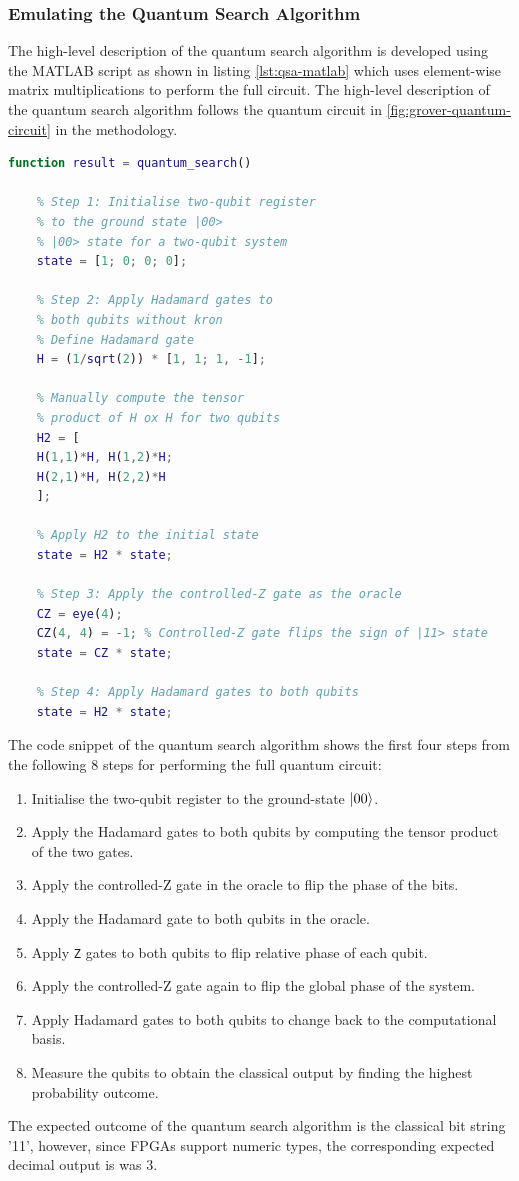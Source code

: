 \subsubsection{Emulating the Quantum Search Algorithm}

The high-level description of the quantum search algorithm is developed using the MATLAB script as shown in listing \ref{lst:qsa-matlab} which uses element-wise matrix multiplications to perform the full circuit. The high-level description of the quantum search algorithm follows the quantum circuit in \ref{fig:grover-quantum-circuit} in the methodology. 
\begin{lstlisting}[language=Matlab, caption={Code snippet of the MATLAB high-level description of the quantum search algorithm perform as element-wise matrix operations.}, label={lst:qsa-matlab}]
function result = quantum_search()

	% Step 1: Initialise two-qubit register 
	% to the ground state |00>
	% |00> state for a two-qubit system
	state = [1; 0; 0; 0]; 
	
	% Step 2: Apply Hadamard gates to
	% both qubits without kron
	% Define Hadamard gate
	H = (1/sqrt(2)) * [1, 1; 1, -1];
	
	% Manually compute the tensor 
	% product of H ox H for two qubits
	H2 = [
	H(1,1)*H, H(1,2)*H;
	H(2,1)*H, H(2,2)*H
	];
	
	% Apply H2 to the initial state
	state = H2 * state;
	
	% Step 3: Apply the controlled-Z gate as the oracle
	CZ = eye(4);
	CZ(4, 4) = -1; % Controlled-Z gate flips the sign of |11> state
	state = CZ * state;
	
	% Step 4: Apply Hadamard gates to both qubits
	state = H2 * state;
\end{lstlisting}
The code snippet of the quantum search algorithm shows the first four steps from the following 8 steps for performing the full quantum circuit:
\begin{enumerate}
	\item 
	Initialise the two-qubit register to the ground-state $\ket{00}$.
	\item 
	Apply the Hadamard gates to both qubits by computing the tensor product of the two gates.
	\item 
	Apply the controlled-Z gate in the oracle to flip the phase of the bits.
	\item 
	Apply the Hadamard gate to both qubits in the oracle.
	\item 
	Apply \texttt{Z} gates to both qubits to flip relative phase of each qubit.
	\item 
	Apply the controlled-Z gate	again to flip the global phase of the system.
	\item 
	Apply Hadamard gates to both qubits to change back to the computational basis.
	\item 
	Measure the qubits to obtain the classical output by finding the highest probability outcome.
\end{enumerate}
The expected outcome of the quantum search algorithm is the classical bit string '11', however, since FPGAs support numeric types, the corresponding expected decimal output is was 3.


